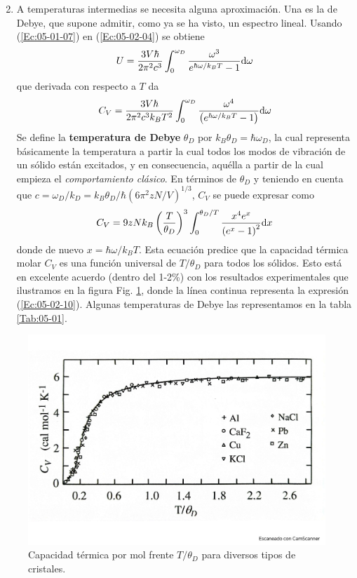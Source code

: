 \begin{enumerate}
\begin{equation}
    \end{equation}
    \item A temperaturas intermedias se necesita alguna aproximación. Una es la de Debye, que supone admitir, como ya se ha visto, un espectro lineal. Usando (\ref{Ec:05-01-07}) en (\ref{Ec:05-02-04}) se obtiene 
    \begin{equation}
        U = \frac{3V\hbar}{2 \pi^2 c^3} \int_0^{\omega_D} \frac{\omega^3}{e^{\hbar \omega/k_B T} - 1} \mathrm{d} \omega
    \end{equation}
    que derivada con respecto a $T$ da
    \begin{equation}
        C_V = \frac{3V\hbar}{2 \pi^2 c^3 k_B T^2} \int_0^{\omega_D} \frac{\omega^4}{\left( e^{\hbar \omega/k_B T} - 1 \right)} \mathrm{d} \omega
    \end{equation}
    Se define la \textbf{temperatura de Debye} $\theta_D$ por $k_B\theta_D=\hbar \omega_D$, la cual representa básicamente la temperatura a partir la cual todos los modos de vibración de un sólido están excitados, y en consecuencia, aquélla a partir de la cual empieza el \textit{comportamiento clásico}. En términos de $\theta_D$ y teniendo en cuenta que $c=\omega_D /k_D = k_B \theta_D / \hbar (6 \pi^2 z N/V)^{1/3}$, $C_V$ se puede expresar como
    \begin{equation}
        C_V = 9zNk_B \left( \frac{T}{\theta_D} \right)^3 \int_0^{\theta_D/T} \frac{x^4 e^x}{\left( e^x-1 \right)^2}\mathrm{d} x \label{Ec:05-02-10}
    \end{equation}
    donde de nuevo $x=\hbar \omega / k_B T$. Esta ecuación predice que la capacidad térmica molar $C_V$ es una función universal de $T/\theta_D$ para todos los sólidos. Esto está en excelente acuerdo (dentro del 1-2\%) con los resultados experimentales que ilustramos en la figura Fig. \ref{Fig:05-04}, donde la línea continua representa la expresión (\ref{Ec:05-02-10}). Algunas temperaturas de Debye las representamos en la tabla \ref{Tab:05-01}.
\end{enumerate}

\begin{figure}[h!] \centering
    \includegraphics[scale=0.35]{Cuerpo/Ch_05/Fotos libro 4.pdf}
    \caption{Capacidad térmica por mol frente $T/\theta_D$ para diversos tipos de cristales.}
    \label{Fig:05-04}
\end{figure}    

